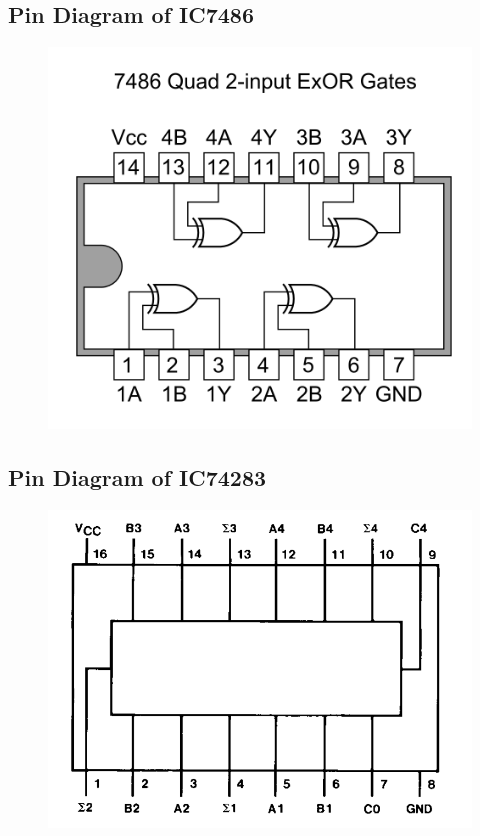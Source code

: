 \documentclass[11pt]{article}
\begin{document}
\subsection{Pin Diagram of IC7486}
\begin{figure}[H]
\centering
\includegraphics[scale=0.4]{7486.png}
\end{figure}

\subsection{Pin Diagram of IC74283}
\begin{figure}[H]
\centering
\includegraphics[scale=0.5]{IC74283.png}
\end{figure}
\end{document}

